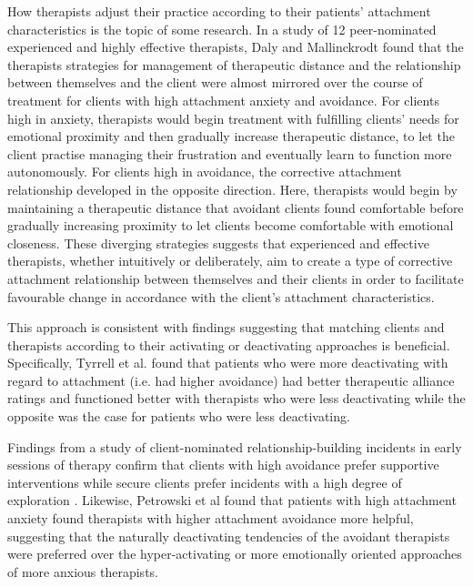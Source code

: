\documentclass[12pt]{report}
\begin{document}
How therapists adjust their practice according to their patients' attachment characteristics is the topic of some research.
In a study of 12 peer-nominated experienced and highly effective therapists, Daly and Mallinckrodt \cite{Daly2009} found that the therapists strategies for management of therapeutic distance and the relationship between themselves and the client were almost mirrored over the course of treatment for clients with high attachment anxiety and avoidance.
For clients high in anxiety, therapists would begin treatment with fulfilling clients' needs for emotional proximity and then gradually increase therapeutic distance, to let the client practise managing their frustration and eventually learn to function more autonomously.
For clients high in avoidance, the corrective attachment relationship developed in the opposite direction. Here, therapists would begin by maintaining a therapeutic distance that avoidant clients found comfortable before gradually increasing proximity to let clients become comfortable with emotional closeness.
These diverging strategies suggests that experienced and effective therapists, whether intuitively or deliberately, aim to create a type of corrective attachment relationship between themselves and their clients in order to facilitate favourable change in accordance with the client's attachment characteristics.

This approach is consistent with findings suggesting that matching clients and therapists according to their activating or deactivating approaches is beneficial. Specifically, Tyrrell et al. \cite{Tyrrell1999} found that patients who were more deactivating with regard to attachment (i.e. had higher avoidance) had better therapeutic alliance ratings and functioned better with therapists who were less deactivating while the opposite was the case for patients who were less deactivating.

Findings from a study of client-nominated relationship-building incidents in early sessions of therapy confirm that clients with high avoidance prefer supportive interventions while secure clients prefer incidents with a high degree of exploration \cite{Janzen2010}.
Likewise, Petrowski et al \cite{Petrowski2011} found that patients with high attachment anxiety found therapists with higher attachment avoidance more helpful, suggesting that the naturally deactivating tendencies of the avoidant therapists were preferred over the hyper-activating or more emotionally oriented approaches of more anxious therapists.
\end{document}
